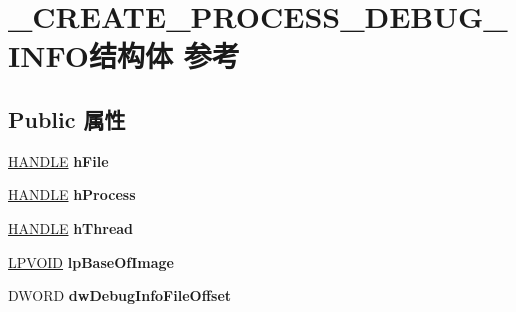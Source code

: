 \hypertarget{struct___c_r_e_a_t_e___p_r_o_c_e_s_s___d_e_b_u_g___i_n_f_o}{}\section{\+\_\+\+C\+R\+E\+A\+T\+E\+\_\+\+P\+R\+O\+C\+E\+S\+S\+\_\+\+D\+E\+B\+U\+G\+\_\+\+I\+N\+F\+O结构体 参考}
\label{struct___c_r_e_a_t_e___p_r_o_c_e_s_s___d_e_b_u_g___i_n_f_o}
\subsection*{Public 属性}
\begin{DoxyCompactItemize}
\item 
\mbox{\label{struct___c_r_e_a_t_e___p_r_o_c_e_s_s___d_e_b_u_g___i_n_f_o_a499a729918cd96825633ea186d720fd4}} 
\hyperlink{interfacevoid}{H\+A\+N\+D\+LE} {\bfseries h\+File}
\item 
\mbox{\label{struct___c_r_e_a_t_e___p_r_o_c_e_s_s___d_e_b_u_g___i_n_f_o_ad7cf16aed875fd75ae0612eecfa1edb3}} 
\hyperlink{interfacevoid}{H\+A\+N\+D\+LE} {\bfseries h\+Process}
\item 
\mbox{\label{struct___c_r_e_a_t_e___p_r_o_c_e_s_s___d_e_b_u_g___i_n_f_o_a302ac0f4ab0fc443699893195aaa58ac}} 
\hyperlink{interfacevoid}{H\+A\+N\+D\+LE} {\bfseries h\+Thread}
\item 
\mbox{\label{struct___c_r_e_a_t_e___p_r_o_c_e_s_s___d_e_b_u_g___i_n_f_o_afb32a0777b69aa846f3c4dac54fd4475}} 
\hyperlink{interfacevoid}{L\+P\+V\+O\+ID} {\bfseries lp\+Base\+Of\+Image}
\item 
\mbox{\label{struct___c_r_e_a_t_e___p_r_o_c_e_s_s___d_e_b_u_g___i_n_f_o_a9cef928b441d8bd538626cc1553a8f07}} 
D\+W\+O\+RD {\bfseries dw\+Debug\+Info\+File\+Offset}
\item 
\mbox{\label{struct___c_r_e_a_t_e___p_r_o_c_e_s_s___d_e_b_u_g___i_n_f_o_afa25958bbba7bb33ec5d34c84ae44042}} 

\end{DoxyCompactItemize}
